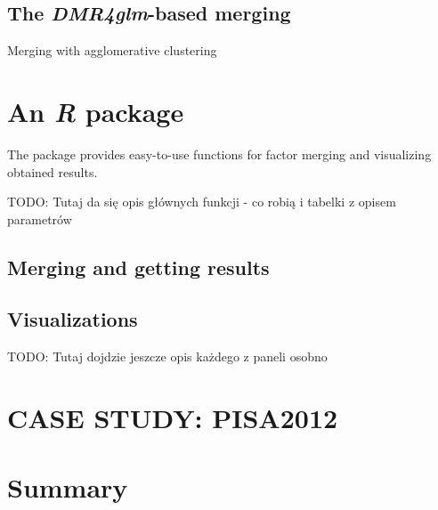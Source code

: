 \subsection{The \emph{DMR4glm}-based merging}


\begin{algorithm}[H]
\caption{Merging with agglomerative clustering}
\begin{algorithmic}[2]

\EndFor
        
\Else 
{}
\EndIf
    \EndFunction
\end{algorithmic}
\end{algorithm}


\section{An \emph{R} package \factorMerger}

The \factorMerger package provides easy-to-use functions for factor merging and visualizing obtained results. 

TODO: Tutaj da się opis głównych funkcji - co robią i tabelki z opisem parametrów

\subsection{Merging and getting results}

\subsection{Visualizations}

TODO: Tutaj dojdzie jeszcze opis każdego z paneli osobno

\section{CASE STUDY: PISA2012}


\section{Summary}

